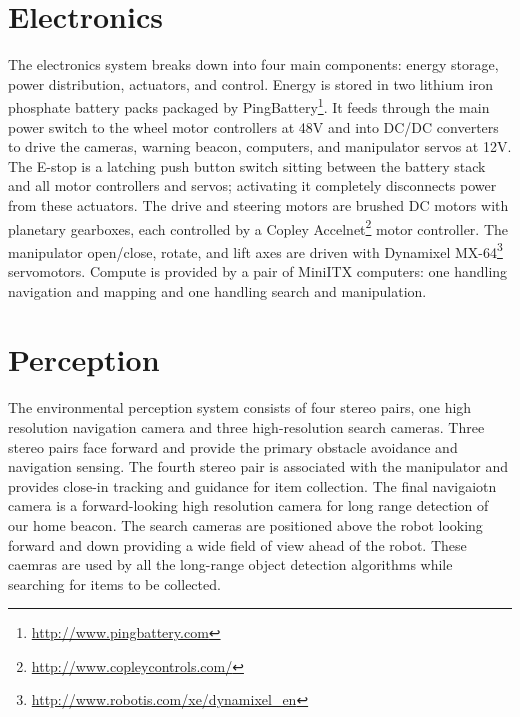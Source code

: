 \documentclass[12pt]{article}
\begin{document}
\section{Electronics}\label{Electronics}

The electronics system breaks down into four main components: energy storage,
power distribution, actuators, and control. Energy is stored in two lithium
iron phosphate battery packs packaged by
PingBattery\footnote{\url{http://www.pingbattery.com}}. It feeds through the
main power switch to the wheel motor controllers at 48V and into DC/DC
converters to drive the cameras, warning beacon, computers, and manipulator
servos at 12V. The E-stop is a latching push button switch sitting between the
battery stack and all motor controllers and servos; activating it completely
disconnects power from these actuators. The drive and steering motors are
brushed DC motors with planetary gearboxes, each controlled by a Copley
Accelnet\footnote{\url{http://www.copleycontrols.com/}} motor controller. The
manipulator open/close, rotate, and lift axes are driven with Dynamixel
MX-64\footnote{\url{http://www.robotis.com/xe/dynamixel_en}} servomotors.
Compute is provided by a pair of MiniITX computers: one handling navigation and
mapping and one handling search and manipulation.

\section{Perception}\label{Perception}
The environmental perception system consists of four stereo pairs, one high
resolution navigation camera and three high-resolution search cameras. Three
stereo pairs face forward and provide the primary obstacle avoidance and
navigation sensing. The fourth stereo pair is associated with the manipulator
and provides close-in tracking and guidance for item collection. The final
navigaiotn camera is a forward-looking high resolution camera for long range
detection of our home beacon. The search cameras are positioned above the robot
looking forward and down providing a wide field of view ahead of the robot.
These caemras are used by all the long-range object detection algorithms while
searching for items to be collected.
\end{document}
